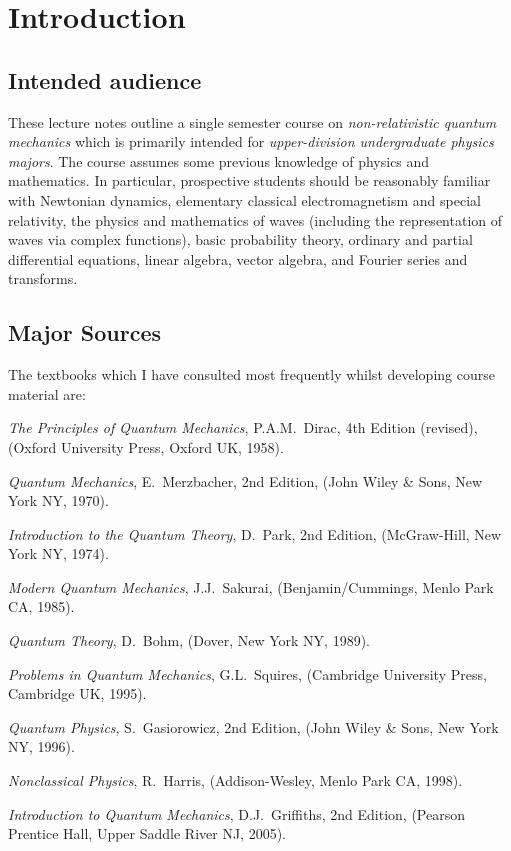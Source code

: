 \chapter{Introduction}
\section{Intended audience}
These lecture notes outline a single semester course on {\em non-relativistic quantum mechanics}\/   which  is primarily intended for {\em upper-division undergraduate physics majors}.
The course assumes some previous knowledge of physics and mathematics. In particular, prospective students should be reasonably familiar with Newtonian dynamics, elementary classical electromagnetism and special relativity, the physics and mathematics of waves (including the representation of
waves via complex functions), basic
probability theory, ordinary and partial differential equations, linear algebra, vector
algebra, and Fourier series and transforms.

\section{Major Sources}
The textbooks which I have consulted most frequently whilst developing course material are:
\begin{description}
\item {\em The Principles of Quantum Mechanics},
P.A.M.~Dirac, 4th Edition (revised), (Oxford University Press, Oxford UK, 1958).
\item {\em Quantum Mechanics}, E.~Merzbacher, 2nd Edition, (John Wiley \& Sons, New York NY, 1970).
\item {\em Introduction to the Quantum Theory}, D.~Park, 2nd Edition,
(McGraw-Hill, New York NY, 1974).
\item {\em Modern Quantum Mechanics}, J.J.~Sakurai, (Benjamin/Cummings,
Menlo Park CA, 1985).
\item {\em Quantum Theory}, D.~Bohm, (Dover, New York NY, 1989).
\item {\em Problems in Quantum Mechanics}, G.L.~Squires, (Cambridge University Press, Cambridge UK, 1995).
\item {\em Quantum Physics}, S.~Gasiorowicz, 2nd Edition,  (John Wiley \& 
Sons, New York NY, 1996).
\item {\em Nonclassical Physics}, R.~Harris, (Addison-Wesley, Menlo Park CA, 1998).
\item {\em Introduction to Quantum Mechanics},  D.J.~Griffiths, 2nd Edition, (Pearson
Prentice Hall, Upper Saddle River NJ, 2005).
\end{description}


